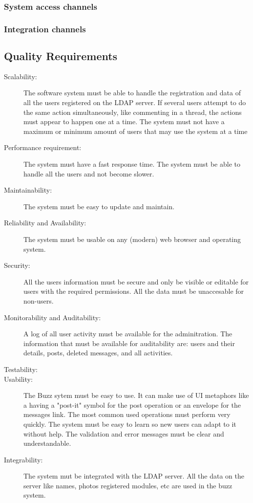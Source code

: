 \documentclass[12pt]{article}
\begin{document}
\subsubsection{System access channels}
\subsubsection{Integration channels}


\subsection{Quality Requirements}
\begin{description}
  \item[Scalability:] 
        The software system must be able to handle the registration and data of all the users registered on the LDAP server. 
       If several users attempt to do the same action simultaneously, like commenting in a thread, the actions must appear to happen one at a time. 
      The system must not have a maximum or minimum amount of users that may use the system at a time
  \item[Performance requirement:]
      The system must have a fast response time. The system must be able to handle all the users and not become slower.
  \item[Maintainability:] 
      The system must be easy to update and maintain.
  \item[Reliability and Availability:]
      The system must be usable on any (modern) web browser and operating system.
  \item[Security:]
      All the users information must be secure and only be visible or editable for users with the required permissions. All the data must be unaccesable for non-users.
  \item[Monitorability and Auditability:]
      A log of all user activity must be available for the adminitration. The information that must be available for auditability are: users and their details, posts, deleted messages, and all activities.
  \item[Testability:]

  \item[Usability:]
      The Buzz sytem must be easy to use. It can make use of UI metaphors like a having a "post-it" symbol for the post operation or an envelope for the messages link.
      The most common used operations must perform very quickly. The system must be easy to learn so new users can adapt to it without help. 
      The validation and error messages must be clear and understandable.
  \item[Integrability:]
      The system mut be integrated with the LDAP server. 
      All the data on the server like names, photos registered modules, etc are used in the buzz system. 
\end{description}
\end{document}
